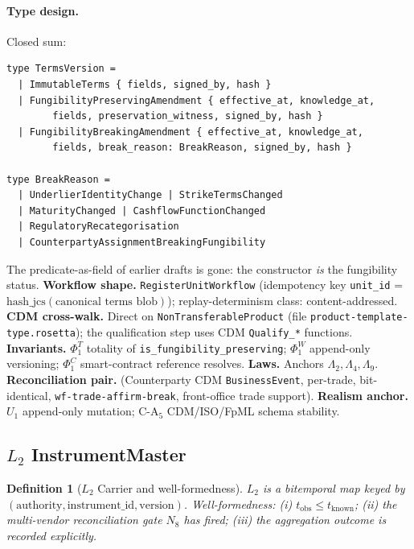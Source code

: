 \documentclass[11pt,a4paper]{article}
\newtheorem{definition}{Definition}[section]
\begin{document}
\paragraph{Type design.} Closed sum:
\begin{lstlisting}
type TermsVersion =
  | ImmutableTerms { fields, signed_by, hash }
  | FungibilityPreservingAmendment { effective_at, knowledge_at,
        fields, preservation_witness, signed_by, hash }
  | FungibilityBreakingAmendment { effective_at, knowledge_at,
        fields, break_reason: BreakReason, signed_by, hash }

type BreakReason =
  | UnderlierIdentityChange | StrikeTermsChanged
  | MaturityChanged | CashflowFunctionChanged
  | RegulatoryRecategorisation
  | CounterpartyAssignmentBreakingFungibility
\end{lstlisting}
The predicate-as-field of earlier drafts is gone: the constructor \emph{is} the fungibility status. \textbf{Workflow shape.} \texttt{RegisterUnitWorkflow} (idempotency key \texttt{unit\_id} = $\mathrm{hash\_jcs}(\text{canonical terms blob})$); replay-determinism class: content-addressed. \textbf{CDM cross-walk.} Direct on \texttt{NonTransferableProduct} (file \texttt{product-template-type.rosetta}); the qualification step uses CDM \texttt{Qualify\_*} functions. \textbf{Invariants.} $\Phi_1^T$ totality of \texttt{is\_fungibility\_preserving}; $\Phi_1^W$ append-only versioning; $\Phi_1^C$ smart-contract reference resolves. \textbf{Laws.} Anchors $\Lambda_2, \Lambda_4, \Lambda_9$. \textbf{Reconciliation pair.} (Counterparty CDM \texttt{BusinessEvent}, per-trade, bit-identical, \texttt{wf-trade-affirm-break}, front-office trade support). \textbf{Realism anchor.} $U_1$ append-only mutation; $\mathrm{C\textrm{-}A}_5$ CDM/ISO/FpML schema stability.

\subsection{$L_2$ InstrumentMaster}
\label{sec:leaf-l2}

\begin{definition}[$L_2$ Carrier and well-formedness]
$L_2$ is a bitemporal map keyed by $(\text{authority}, \text{instrument\_id}, \text{version})$. Well-formedness: (i) $t_{\mathrm{obs}} \le t_{\mathrm{known}}$; (ii) the multi-vendor reconciliation gate $N_8$ has fired; (iii) the aggregation outcome is recorded explicitly.
\end{definition}
\end{document}
